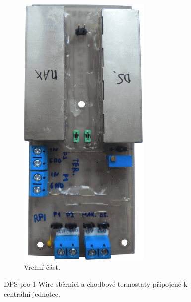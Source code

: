 \begin{figure}[H]
\begin{subfigure}{.5\textwidth}
    \label{fig:dps-rpi-1-wire-termostaty-ochrany-spodek}
\end{subfigure}%
\begin{subfigure}{.5\textwidth}
    \centering
    \includegraphics[width=0.7\textwidth]{images/vstupy-vystupu-rpi/dps-rpi-1-wire-termostaty-ochrany-vrsek.png}
    \caption{Vrchní část.}
    \label{fig:dps-rpi-1-wire-termostaty-ochrany-vrsek}
\end{subfigure}
\caption{DPS pro 1-Wire sběrnici a chodbové termostaty připojené k centrální jednotce.}
\label{fig:dps-pro-ochranu-vstupu-vystupu-pro-raspberry-pi}
\end{figure}